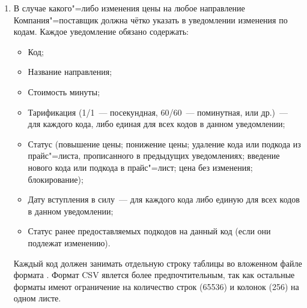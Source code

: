 \begin{Form}
    \begin{enumerate}[label=\thesection.\arabic*.]
    \item В случае какого"=либо изменения цены на любое направление Компания"=поставщик
      должна чётко указать в уведомлении изменения по кодам. Каждое уведомление
      обязано содержать: 

      \begin{itemize}
      \item Код;
      \item Название направления;
      \item Стоимость минуты;
      \item Тарификация (1/1~--- посекундная, 60/60~--- поминутная, или др.)~---
        для каждого кода, либо единая для всех кодов в данном уведомлении; 
      \item Статус (повышение цены; понижение цены; удаление кода или подкода
        из прайс"=листа, прописанного в предыдущих уведомлениях; введение нового
        кода или подкода в прайс"=лист; цена без изменения; блокирование);
      \item Дату вступления в силу~--- для каждого кода либо единую для всех
        кодов в данном уведомлении;
      \item Статус ранее предоставляемых подкодов на данный код (если они подлежат
        изменению).
      \end{itemize}

    Каждый код должен занимать отдельную строку таблицы во вложенном файле
    формата  
    . Формат CSV явлется более предпочтительным,
    так как остальные форматы имеют ограничение на количество строк (65536) и колонок (256) на одном листе.


\end{enumerate}
\end{Form}

